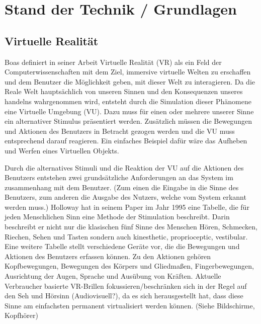 \chapter{Stand der Technik / Grundlagen}

\section{Virtuelle Realität}
Boas definiert in  seiner Arbeit \cite{Boas2012} Virtuelle Realität (VR) als ein Feld der Computerwissenschaften mit dem Ziel, immersive virtuelle Welten zu erschaffen und dem Benutzer die Möglichkeit geben, mit dieser Welt zu interagieren. 
Da die Reale Welt hauptsächlich von unseren Sinnen und den Konsequenzen unseres handelns wahrgenommen wird, entsteht durch die Simulation dieser Phänomene eine Virtuelle Umgebung (VU). Dazu muss für einen oder mehrere unserer Sinne ein alternativer Stimulus präsentiert werden. Zusätzlich müssen die Bewegungen und Aktionen des Benutzers in Betracht gezogen werden und die VU muss entsprechend darauf reagieren. Ein einfaches Beispiel dafür wäre das Aufheben und Werfen eines Virtuellen Objekts.

Durch die alternatives Stimuli und die Reaktion der VU auf die Aktionen des Benutzers entstehen zwei grundsätzliche Anforderungen an das System im zusammenhang mit dem Benutzer. (Zum einen die Eingabe in die Sinne des Benutzers, zum anderen die Ausgabe des Nutzers, welche vom System erkannt werden muss.)
Holloway\cite{Holloway1995} hat in seinem Paper im Jahr 1995 eine Tabelle, die für jeden Menschlichen Sinn eine Methode der Stimulation beschreibt. Darin beschreibt er nicht nur die klasischen fünf Sinne des Menschen Hören, Schmecken, Riechen, Sehen und Tasten sondern auch kinesthetic, proprioceptic, vestibular.
Eine weitere Tabelle stellt verschiedene Geräte vor, die die Bewegungen und Aktionen des Benutzers erfassen können. Zu den Aktionen gehören Kopfbewegungen, Bewegungen des Körpers und Gliedmaßen, Fingerbewegungen, Ausrichtung der Augen, Sprache und Ausübung von Kräften.
Aktuelle Verbraucher basierte VR-Brillen fokussieren/beschränken sich in der Regel auf den Seh und Hörsinn (Audiovisuell?), da es sich herausgestellt hat, dass diese Sinne am einfachsten permanent virtualisiert werden können. (Siehe Bildschirme, Kopfhörer)\cite{Holloway1995}

